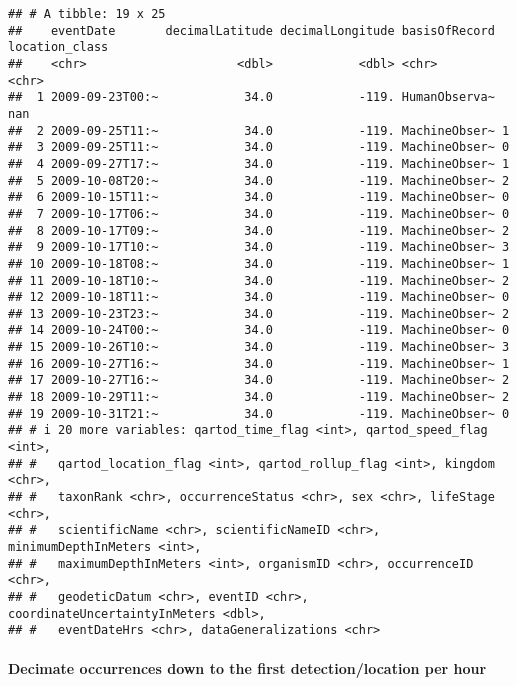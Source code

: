 \documentclass[
]{book}
\begin{document}
\begin{verbatim}
## # A tibble: 19 x 25
##    eventDate       decimalLatitude decimalLongitude basisOfRecord location_class
##    <chr>                     <dbl>            <dbl> <chr>         <chr>         
##  1 2009-09-23T00:~            34.0            -119. HumanObserva~ nan           
##  2 2009-09-25T11:~            34.0            -119. MachineObser~ 1             
##  3 2009-09-25T11:~            34.0            -119. MachineObser~ 0             
##  4 2009-09-27T17:~            34.0            -119. MachineObser~ 1             
##  5 2009-10-08T20:~            34.0            -119. MachineObser~ 2             
##  6 2009-10-15T11:~            34.0            -119. MachineObser~ 0             
##  7 2009-10-17T06:~            34.0            -119. MachineObser~ 0             
##  8 2009-10-17T09:~            34.0            -119. MachineObser~ 2             
##  9 2009-10-17T10:~            34.0            -119. MachineObser~ 3             
## 10 2009-10-18T08:~            34.0            -119. MachineObser~ 1             
## 11 2009-10-18T10:~            34.0            -119. MachineObser~ 2             
## 12 2009-10-18T11:~            34.0            -119. MachineObser~ 0             
## 13 2009-10-23T23:~            34.0            -119. MachineObser~ 2             
## 14 2009-10-24T00:~            34.0            -119. MachineObser~ 0             
## 15 2009-10-26T10:~            34.0            -119. MachineObser~ 3             
## 16 2009-10-27T16:~            34.0            -119. MachineObser~ 1             
## 17 2009-10-27T16:~            34.0            -119. MachineObser~ 2             
## 18 2009-10-29T11:~            34.0            -119. MachineObser~ 2             
## 19 2009-10-31T21:~            34.0            -119. MachineObser~ 0             
## # i 20 more variables: qartod_time_flag <int>, qartod_speed_flag <int>,
## #   qartod_location_flag <int>, qartod_rollup_flag <int>, kingdom <chr>,
## #   taxonRank <chr>, occurrenceStatus <chr>, sex <chr>, lifeStage <chr>,
## #   scientificName <chr>, scientificNameID <chr>, minimumDepthInMeters <int>,
## #   maximumDepthInMeters <int>, organismID <chr>, occurrenceID <chr>,
## #   geodeticDatum <chr>, eventID <chr>, coordinateUncertaintyInMeters <dbl>,
## #   eventDateHrs <chr>, dataGeneralizations <chr>
\end{verbatim}

\hypertarget{decimate-occurrences-down-to-the-first-detectionlocation-per-hour}{%
\paragraph{Decimate occurrences down to the first detection/location per hour}\label{decimate-occurrences-down-to-the-first-detectionlocation-per-hour}}
\end{document}
